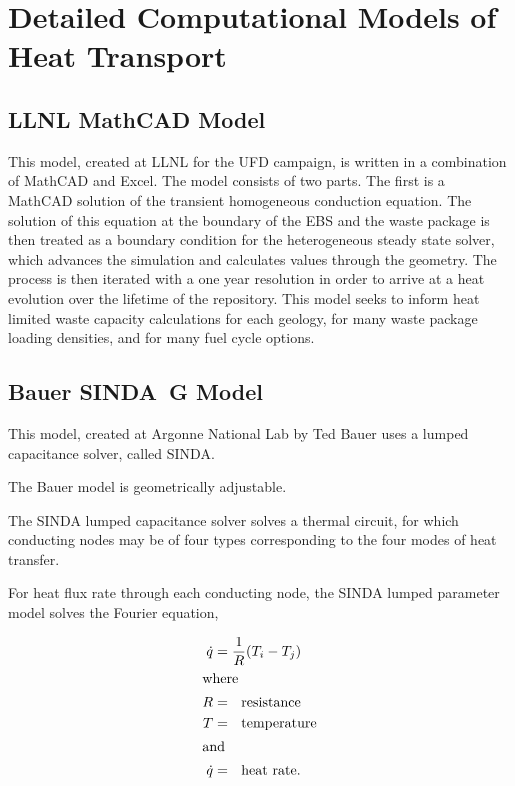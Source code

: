 \section{Detailed Computational Models of Heat Transport}
\label{sec:detailed_heat}



\subsection{LLNL MathCAD Model}

This model, created at \gls{LLNL} for the \gls{UFD} campaign, is written in a 
combination of MathCAD and Excel. The model consists of two parts. The first is 
a MathCAD solution of the transient homogeneous conduction equation. The 
solution of this equation at the boundary of the EBS and the waste package is 
then treated as a boundary condition for the heterogeneous steady state solver, 
which advances the simulation and calculates values through the geometry. The 
process is then iterated with a one year resolution in order to arrive at a heat 
evolution over  the lifetime of the repository. This model seeks to inform heat
limited waste capacity calculations for each geology, for many waste package 
loading densities, and for many fuel cycle options.  


\subsection{Bauer SINDA\ G Model}

This model, created at Argonne National Lab by Ted Bauer uses a lumped 
capacitance solver, called SINDA.

The Bauer model is geometrically adjustable. 

The SINDA lumped capacitance solver solves a thermal circuit, for which 
conducting nodes may be of four types corresponding to the four modes of heat 
transfer. 

For heat flux rate through each conducting node, the SINDA lumped parameter 
model solves the Fourier equation,

\begin{align}
  \dot{q} &= \frac{1}{R}( T_i - T_j )\\
  \label{sindafourier}
  \intertext{where}
  R &= ~~\mbox{resistance}\nonumber\\
  T &= ~~\mbox{temperature}\nonumber\\
  \intertext{and}
  \dot{q} &= ~~\mbox{heat rate}.\nonumber
\end{align}

